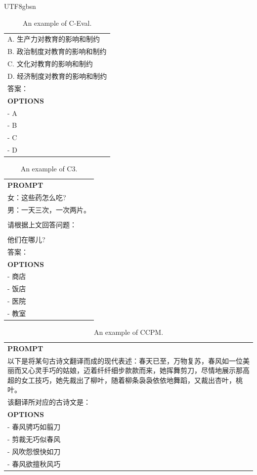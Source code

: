 \documentclass[11pt, a4paper, logo, copyright, nonumbering]{deepseek}
\begin{document}
\begin{CJK*}{UTF8}{gbsn}
\begin{table}[ht]
\begin{tabular}{p{12cm}}
\\A. 生产力对教育的影响和制约
\\B. 政治制度对教育的影响和制约
\\C. 文化对教育的影响和制约
\\D. 经济制度对教育的影响和制约
\\答案：\\
\midrule
\textbf{OPTIONS}\\
- A\\
- B\\
- C\\
- D\\
\bottomrule
\end{tabular}
    \caption{\centering An example of C-Eval.}
    \label{tab:ceval_eval_format_example}
\end{table}

\begin{table}[ht]
    \centering \small
\begin{tabular}{p{12cm}}
\toprule
\textbf{PROMPT}\\
女：这些药怎么吃?
\\男：一天三次，一次两片。
\\
\\请根据上文回答问题：
\\
\\他们在哪儿?
\\答案：\\
\midrule
\textbf{OPTIONS}\\
- 商店\\
- 饭店\\
- 医院\\
- 教室\\
\bottomrule
\end{tabular}
    \caption{\centering An example of C3.}
    \label{tab:c3_eval_format_example}
\end{table}

\begin{table}[ht]
    \centering \small
\begin{tabular}{p{12cm}}
\toprule
\textbf{PROMPT}\\
以下是将某句古诗文翻译而成的现代表述：春天已至，万物复苏，春风如一位美丽而又心灵手巧的姑娘，迈着纤纤细步款款而来，她挥舞剪刀，尽情地展示那高超的女工技巧，她先裁出了柳叶，随着柳条袅袅依依地舞蹈，又裁出杏叶，桃叶。
\\该翻译所对应的古诗文是：\\
\midrule
\textbf{OPTIONS}\\
- 春风骋巧如翦刀\\
- 剪裁无巧似春风\\
- 风吹怨恨快如刀\\
- 春风欲擅秋风巧\\
\bottomrule
\end{tabular}
    \caption{\centering An example of CCPM.}
    \label{tab:ccpm_eval_format_example}
\end{table}


\end{CJK*}
\end{document}
